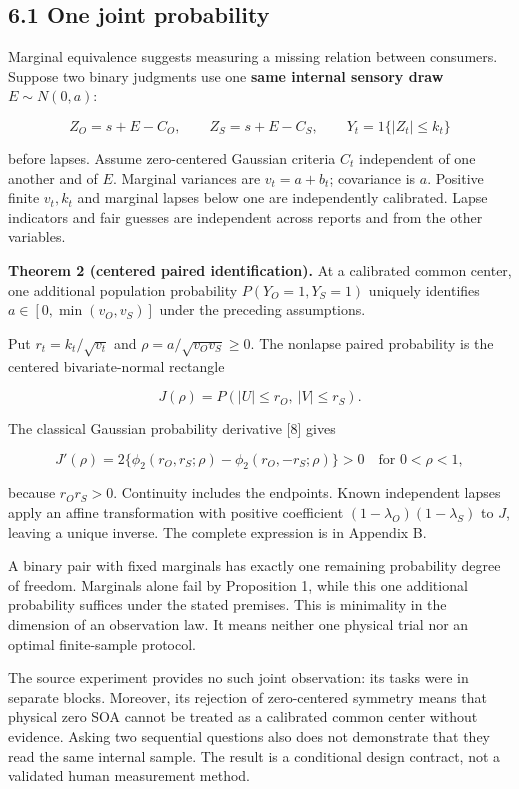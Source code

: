 \documentclass[
  11pt,
]{article}
\let\ctdoldsubsection\subsection
\renewcommand{\subsection}{\Needspace{6\baselineskip}\ctdoldsubsection}
\begin{document}
\hypertarget{one-joint-probability}{%
\subsection{6.1 One joint probability}\label{one-joint-probability}}

Marginal equivalence suggests measuring a missing relation between
consumers. Suppose two binary judgments use one \textbf{same internal
sensory draw} \(E\sim N(0,a)\):

\[
Z_O=s+E-C_O,\qquad Z_S=s+E-C_S,
\qquad Y_t=1\{|Z_t|\leq k_t\}
\tag{9}
\]

before lapses. Assume zero-centered Gaussian criteria \(C_t\)
independent of one another and of \(E\). Marginal variances are
\(v_t=a+b_t\); covariance is \(a\). Positive finite \(v_t,k_t\) and
marginal lapses below one are independently calibrated. Lapse indicators
and fair guesses are independent across reports and from the other
variables.

\textbf{Theorem 2 (centered paired identification).} At a calibrated
common center, one additional population probability \(P(Y_O=1,Y_S=1)\)
uniquely identifies \(a\in[0,\min(v_O,v_S)]\) under the preceding
assumptions.

Put \(r_t=k_t/\sqrt{v_t}\) and \(\rho=a/\sqrt{v_Ov_S}\geq0\). The
nonlapse paired probability is the centered bivariate-normal rectangle

\[
J(\rho)=P(|U|\leq r_O,\ |V|\leq r_S).
\]

The classical Gaussian probability derivative {[}8{]} gives

\[
J'(\rho)=2\{\phi_2(r_O,r_S;\rho)
-\phi_2(r_O,-r_S;\rho)\}>0
\quad\text{for }0<\rho<1,
\tag{10}
\]

because \(r_Or_S>0\). Continuity includes the endpoints. Known
independent lapses apply an affine transformation with positive
coefficient \((1-\lambda_O)(1-\lambda_S)\) to \(J\), leaving a unique
inverse. The complete expression is in Appendix B.

A binary pair with fixed marginals has exactly one remaining probability
degree of freedom. Marginals alone fail by Proposition 1, while this one
additional probability suffices under the stated premises. This is
minimality in the dimension of an observation law. It means neither one
physical trial nor an optimal finite-sample protocol.

The source experiment provides no such joint observation: its tasks were
in separate blocks. Moreover, its rejection of zero-centered symmetry
means that physical zero SOA cannot be treated as a calibrated common
center without evidence. Asking two sequential questions also does not
demonstrate that they read the same internal sample. The result is a
conditional design contract, not a validated human measurement method.
\end{document}
